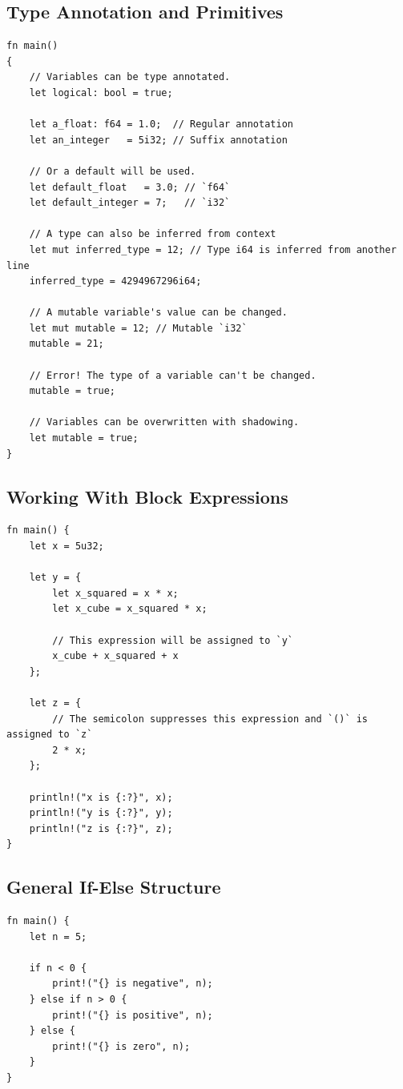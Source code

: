 \documentclass{article}
\begin{document}
\subsection*{Type Annotation and Primitives}
\begin{verbatim}
fn main()
{
    // Variables can be type annotated.
    let logical: bool = true;

    let a_float: f64 = 1.0;  // Regular annotation
    let an_integer   = 5i32; // Suffix annotation

    // Or a default will be used.
    let default_float   = 3.0; // `f64`
    let default_integer = 7;   // `i32`

    // A type can also be inferred from context
    let mut inferred_type = 12; // Type i64 is inferred from another line
    inferred_type = 4294967296i64;

    // A mutable variable's value can be changed.
    let mut mutable = 12; // Mutable `i32`
    mutable = 21;

    // Error! The type of a variable can't be changed.
    mutable = true;

    // Variables can be overwritten with shadowing.
    let mutable = true;
}

\end{verbatim}

\newpage
\subsection*{Working With Block Expressions}
\begin{verbatim}
fn main() {
    let x = 5u32;

    let y = {
        let x_squared = x * x;
        let x_cube = x_squared * x;

        // This expression will be assigned to `y`
        x_cube + x_squared + x
    };

    let z = {
        // The semicolon suppresses this expression and `()` is assigned to `z`
        2 * x;
    };

    println!("x is {:?}", x);
    println!("y is {:?}", y);
    println!("z is {:?}", z);
}
\end{verbatim}

\subsection*{General If-Else Structure}
\begin{verbatim}
fn main() {
    let n = 5;

    if n < 0 {
        print!("{} is negative", n);
    } else if n > 0 {
        print!("{} is positive", n);
    } else {
        print!("{} is zero", n);
    }
}

\end{verbatim}
\end{document}
